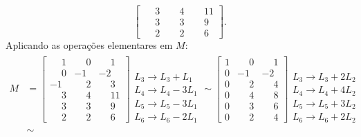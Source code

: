 \begin{exemplo}
\begin{enumerate}[label={\arabic*})]
\begin{solucao}
\[\begin{bmatrix}
					\phantom{-}3 & \phantom{-}4 & \phantom{-}11\\
					\phantom{-}3 & \phantom{-}3 & \phantom{-}9\\
					\phantom{-}2 & \phantom{-}2 & \phantom{-}6
				\end{bmatrix}.
			\]
			Aplicando as opera\c{c}\~oes elementares em $M$:
			\begin{align*}
				M &=
					\left[
						\begin{array}{ccc}
		  					\phantom{-}1 & \phantom{-}0 & \phantom{-}1\\
							\phantom{-}0 & -1 & -2\\
							-1 & \phantom{-}2 & \phantom{-}3\\
							\phantom{-}3 & \phantom{-}4 & \phantom{-}11\\
							\phantom{-}3 & \phantom{-}3 & \phantom{-}9\\
							\phantom{-}2 & \phantom{-}2 & \phantom{-}6
     					\end{array}
     				\right]
     				\begin{array}{l}
     					\phantom{x}\\
     					\phantom{x}\\
     					L_3 \to L_3 + L_1\\
     					L_4 \to L_4 - 3L_1\\
     					L_5 \to L_5 - 3L_1\\
     					L_6 \to L_6 - 2L_1
     				\end{array} \sim
     				\left[
     					\begin{array}{ccc}
		  					1 & \phantom{-}0 & \phantom{-}1\\
							0 & -1 & -2\\
							0 & \phantom{-}2 & \phantom{-}4\\
							0 & \phantom{-}4 & \phantom{-}8\\
							0 & \phantom{-}3 & \phantom{-}6\\
							0 & \phantom{-}2 & \phantom{-}4
     					\end{array}
     				\right]
     				\begin{array}{l}
     					\phantom{x}\\
     					\phantom{x}\\
     					L_3 \to L_3 + 2L_2\\
     					L_4 \to L_4 + 4L_2\\
     					L_5 \to L_5 + 3L_2\\
     					L_6 \to L_6 + 2L_2
     				\end{array}\\ &\sim

\end{align*}
\end{solucao}
\end{enumerate}
\end{exemplo}
